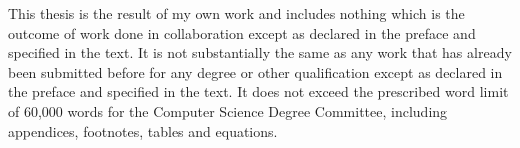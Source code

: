 
\begin{declaration}


This thesis is the result of my own work and includes nothing which is the outcome of work done in collaboration except as declared in the preface and specified in the text.
It is not substantially the same as any work that has already been submitted before for any degree or other qualification except as declared in the preface and specified in the text.
It does not exceed the prescribed word limit of 60,000 words for the Computer Science Degree Committee, including appendices, footnotes, tables and equations. 


\end{declaration}

